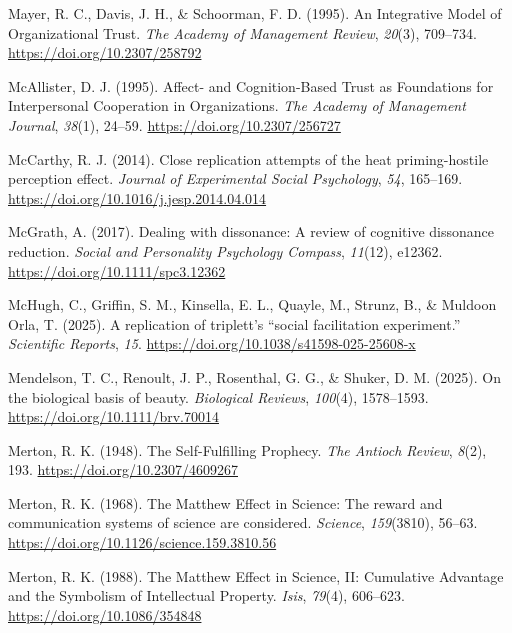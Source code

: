 \documentclass[
  letterpaper,
]{book}
\newlength{\cslhangindent}
\newenvironment{CSLReferences}[2] %
 {\begin{list}{}{%
  \setlength{\itemindent}{0pt}
  \setlength{\leftmargin}{0pt}
  \setlength{\parsep}{0pt}
  \ifodd #1
   \setlength{\leftmargin}{\cslhangindent}
   \setlength{\itemindent}{-1\cslhangindent}
  \fi
  \setlength{\itemsep}{#2\baselineskip}}}
 {\end{list}}
\begin{document}
\begin{CSLReferences}{1}{0}
Mayer, R. C., Davis, J. H., \& Schoorman, F. D. (1995). An {Integrative}
{Model} of {Organizational} {Trust}. \emph{The Academy of Management
Review}, \emph{20}(3), 709--734. \url{https://doi.org/10.2307/258792}

McAllister, D. J. (1995). Affect- and {Cognition}-{Based} {Trust} as
{Foundations} for {Interpersonal} {Cooperation} in {Organizations}.
\emph{The Academy of Management Journal}, \emph{38}(1), 24--59.
\url{https://doi.org/10.2307/256727}

McCarthy, R. J. (2014). Close replication attempts of the heat
priming-hostile perception effect. \emph{Journal of Experimental Social
Psychology}, \emph{54}, 165--169.
\url{https://doi.org/10.1016/j.jesp.2014.04.014}

McGrath, A. (2017). {Dealing with dissonance: A review of cognitive
dissonance reduction}. \emph{{Social and Personality Psychology
Compass}}, \emph{11}(12), e12362.
\url{https://doi.org/10.1111/spc3.12362}

McHugh, C., Griffin, S. M., Kinsella, E. L., Quayle, M., Strunz, B., \&
Muldoon Orla, T. (2025). A replication of triplett's {``social
facilitation experiment.''} \emph{Scientific Reports}, \emph{15}.
\url{https://doi.org/10.1038/s41598-025-25608-x}

Mendelson, T. C., Renoult, J. P., Rosenthal, G. G., \& Shuker, D. M.
(2025). On the biological basis of beauty. \emph{Biological Reviews},
\emph{100}(4), 1578--1593. \url{https://doi.org/10.1111/brv.70014}

Merton, R. K. (1948). The {Self}-{Fulfilling} {Prophecy}. \emph{The
Antioch Review}, \emph{8}(2), 193. \url{https://doi.org/10.2307/4609267}

Merton, R. K. (1968). The {Matthew} {Effect} in {Science}: {The} reward
and communication systems of science are considered. \emph{Science},
\emph{159}(3810), 56--63.
\url{https://doi.org/10.1126/science.159.3810.56}

Merton, R. K. (1988). The {Matthew} {Effect} in {Science}, {II}:
{Cumulative} {Advantage} and the {Symbolism} of {Intellectual}
{Property}. \emph{Isis}, \emph{79}(4), 606--623.
\url{https://doi.org/10.1086/354848}


\end{CSLReferences}
\end{document}
